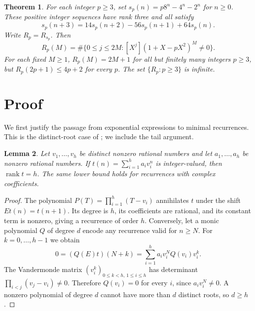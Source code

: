 \documentclass[11pt]{article}
\newtheorem{theorem}{Theorem}
\newtheorem{lemma}[theorem]{Lemma}
\DeclareMathOperator{\rank}{rank}
\begin{document}
\begin{theorem}\label{main}
For each integer $p\geq3$, set $s_p(n)=p8^n-4^n-2^n$ for $n\geq0$.
These positive integer sequences have rank three and all satisfy
\begin{equation}\label{common}
 s_p(n+3)=14s_p(n+2)-56s_p(n+1)+64s_p(n).
\end{equation}
Write $R_p=R_{s_p}$. Then
\begin{equation}\label{support}
 R_p(M)=\#\{0\leq j\leq2M:[X^j](1+X-pX^2)^M\ne0\}.
\end{equation}
For each fixed $M\geq1$, $R_p(M)=2M+1$ for all but finitely many
integers $p\geq3$, but $R_p(2p+1)\leq4p+2$ for every $p$.
The set $\{R_p:p\geq3\}$ is infinite.
\end{theorem}

\section{Proof}
We first justify the passage from exponential expressions to minimal
recurrences. This is the distinct-root case of
\cite[Theorems~2.1--2.2]{RSB}; we include the tail argument.

\begin{lemma}\label{exponential}
Let $v_1,\ldots,v_h$ be distinct nonzero rational numbers and let
$a_1,\ldots,a_h$ be nonzero rational numbers. If
$t(n)=\sum_{i=1}^h a_i v_i^n$ is integer-valued, then $\rank t=h$.
The same lower bound holds for recurrences with complex coefficients.
\end{lemma}
\begin{proof}
The polynomial $P(T)=\prod_{i=1}^h(T-v_i)$ annihilates $t$ under the
shift $Et(n)=t(n+1)$. Its degree is $h$, its coefficients are rational,
and its constant term is nonzero, giving a recurrence of order $h$.
Conversely, let a monic polynomial $Q$ of degree $d$ encode any recurrence
valid for $n\geq N$. For $k=0,\ldots,h-1$ we obtain
\[
 0=(Q(E)t)(N+k)=\sum_{i=1}^h a_i v_i^N Q(v_i)v_i^k.
\]
The Vandermonde matrix $(v_i^k)_{0\leq k<h,\,1\leq i\leq h}$ has
determinant $\prod_{i<j}(v_j-v_i)\ne0$. Therefore $Q(v_i)=0$ for every
$i$, since $a_i v_i^N\ne0$. A nonzero polynomial of degree $d$ cannot
have more than $d$ distinct roots, so $d\geq h$.
\end{proof}
\end{document}
